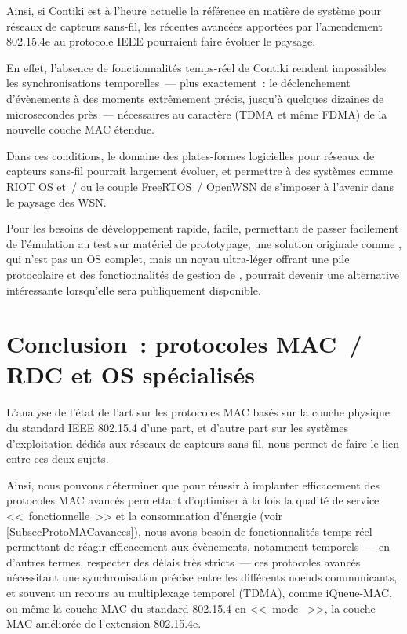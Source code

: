 \bigskip

Ainsi, si Contiki est à l'heure actuelle la référence en matière de
système pour réseaux de capteurs sans-fil, les récentes avancées apportées
par l'amendement 802.15.4e au protocole IEEE pourraient faire évoluer le
paysage.

En effet, l'absence de fonctionnalités temps-réel de Contiki rendent
impossibles les synchronisations temporelles~--- plus exactement~:
le déclenchement d'évènements à des moments extrêmement précis, jusqu'à
quelques dizaines de microsecondes près~--- nécessaires au caractère
 (TDMA et même FDMA) de la nouvelle couche MAC étendue.

Dans ces conditions, le domaine des plates-formes logicielles pour réseaux
de capteurs sans-fil pourrait largement évoluer, et permettre à des
systèmes comme RIOT OS et~/ ou le couple FreeRTOS~/ OpenWSN de
s'imposer à l'avenir dans le paysage des WSN.

\bigskip

Pour les besoins de développement rapide, facile, permettant de passer
facilement de l'émulation au test sur matériel de prototypage, une solution
originale comme  \cite{WiNo2013}, qui n'est pas un OS complet,
mais un noyau ultra-léger offrant une pile protocolaire et des
fonctionnalités de gestion de , pourrait devenir une
alternative intéressante lorsqu'elle sera publiquement disponible.


\section{Conclusion~: protocoles MAC~/ RDC et OS spécialisés}
\label{SecConcluChEtatArt}

L'analyse de l'état de l'art sur les protocoles MAC basés sur la couche
physique du standard IEEE 802.15.4 d'une part, et d'autre part sur les
systèmes d'exploitation dédiés aux réseaux de capteurs sans-fil, nous
permet de faire le lien entre ces deux sujets.

Ainsi, nous pouvons déterminer que pour réussir à implanter efficacement
des protocoles MAC avancés permettant d'optimiser à la fois la qualité
de service <<~fonctionnelle~>> et la consommation d'énergie (voir
\vref{SubsecProtoMACavances}), nous avons besoin de fonctionnalités
temps-réel permettant de réagir efficacement aux évènements, notamment
temporels~--- en d'autres termes, respecter des délais très stricts~---
ces protocoles avancés nécessitant une synchronisation précise entre
les différents noeuds communicants, et souvent un recours au multiplexage
temporel (TDMA), comme iQueue-MAC, ou même la couche MAC du standard
802.15.4 en <<~mode ~>>,  la couche
MAC améliorée de l'extension 802.15.4e.

